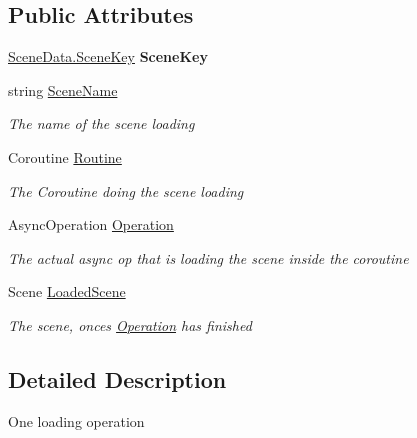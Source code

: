 \subsection*{Public Attributes}
\begin{DoxyCompactItemize}
\item 
\hypertarget{struct_scene_loader_1_1_loading_sequence_a9ae12031c4deea4d8783010cc5233944}{\hyperlink{class_scene_data_a79d397b3deef242a865470283d96f2e6}{Scene\-Data.\-Scene\-Key} {\bfseries Scene\-Key}}\label{struct_scene_loader_1_1_loading_sequence_a9ae12031c4deea4d8783010cc5233944}

\item 
string \hyperlink{struct_scene_loader_1_1_loading_sequence_ac6ab54600d13969b5c4a9a336f61f5a9}{Scene\-Name}
\begin{DoxyCompactList}\small\item\em The name of the scene loading \end{DoxyCompactList}\item 
Coroutine \hyperlink{struct_scene_loader_1_1_loading_sequence_a346ec7dcd6ae9036c62c38fc987dc43d}{Routine}
\begin{DoxyCompactList}\small\item\em The Coroutine doing the scene loading \end{DoxyCompactList}\item 
Async\-Operation \hyperlink{struct_scene_loader_1_1_loading_sequence_aa7b67661c21a69badba77f57a2ac5385}{Operation}
\begin{DoxyCompactList}\small\item\em The actual async op that is loading the scene inside the coroutine \end{DoxyCompactList}\item 
Scene \hyperlink{struct_scene_loader_1_1_loading_sequence_a3c9efe1e6b11e88917c0d375faf0100f}{Loaded\-Scene}
\begin{DoxyCompactList}\small\item\em The scene, onces \hyperlink{struct_scene_loader_1_1_loading_sequence_aa7b67661c21a69badba77f57a2ac5385}{Operation} has finished \end{DoxyCompactList}\end{DoxyCompactItemize}


\subsection{Detailed Description}
One loading operation 



